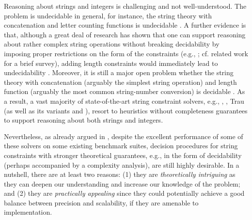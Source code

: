 Reasoning about strings and integers is challenging and not well-understood. 
The problem is undecidable in general,  for instance, the string theory with concatenation and letter counting functions is undecidable \cite{buchi}. 
A further evidence is that, although a great deal of research has shown that one can support reasoning about rather complex string operations without breaking decidability by imposing proper restrictions on the form of the constraints (e.g., \cite{CCH+18,CHL+19}; cf. related work for a brief survey), adding length constraints would immediately lead to undecidability \cite{CCH+18}. Moreover, it is still a major open problem whether the string theory with concatenation (arguably the simplest string operation) and length function (arguably the most common string-number conversion) is decidable \cite{Vijay-length}. 
%
As a result, a vast majority of  state-of-the-art string constraint solvers, e.g., {\cvc} \cite{cvc4}, {\zthree} \cite{Z3-str3}, Trau \cite{Abdulla17} (as well as its variants {\trauplus} \cite{AbdullaA+19} and {\zthreetrau} \cite{Z3-trau}),  
resort to heuristics without completeness guarantees to support reasoning about both strings and integers.

Nevertheless, as already argued in \cite{CHL+19}, despite the excellent performance of some of these solvers on some existing benchmark suites, decision procedures for string constraints with stronger theoretical guarantees, e.g., in the form of decidability (perhaps accompanied by a complexity analysis), are still highly desirable. In a nutshell, there are at least two reasons: (1) they are \emph{theoretically intriguing} as they can deepen our understanding and increase our knowledge of the problem; and  %
(2) they are \emph{practically appealing} since they could potentially achieve a good balance between precision and scalability, if they are amenable to implementation. 

